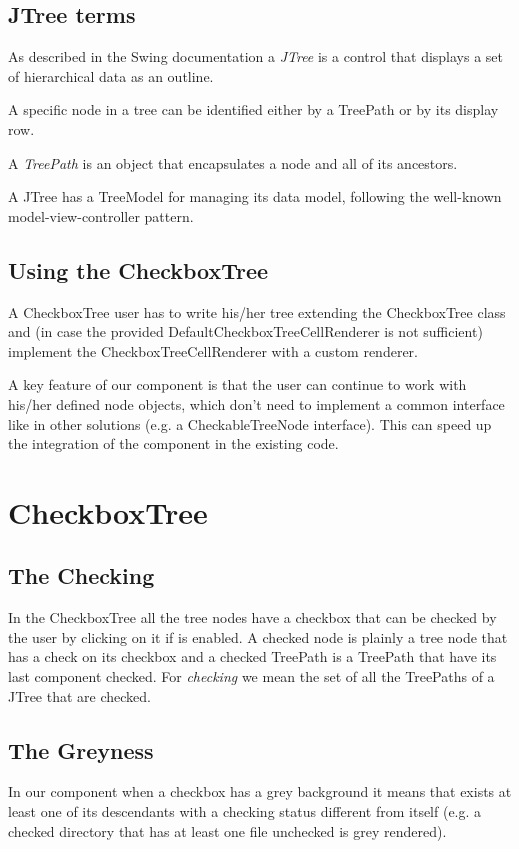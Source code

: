 \documentclass[twocolumn,desyfonts,twoside]{desypaper}  %
\def\CJT{CheckboxTree}
\begin{document}
\subsection{JTree terms}
As described in the Swing documentation \cite{swing-jtree} a
\emph{JTree} is a control that displays a set of hierarchical data
as an outline.

A specific node in a tree can be identified either by a TreePath or
by its display row.

A \emph{TreePath} is an object that encapsulates a node and all of
its ancestors.

A JTree has a TreeModel for managing its data model, following the
well-known model-view-controller pattern.

\subsection{Using the \CJT{}}

A \CJT{} user has to write his/her tree extending the \CJT{} class
and (in case the provided DefaultCheckboxTreeCellRenderer is not
sufficient) implement the CheckboxTreeCellRenderer with a custom
renderer.

A key feature of our component is that the user can continue to work
with his/her defined node objects, which don't need to implement a
common interface like in other solutions (e.g. a CheckableTreeNode
interface). This can speed up the integration of the component in
the existing code.

\section{\CJT{}}

\subsection{The Checking}
In the \CJT{} all the tree nodes have a checkbox that can be checked
by the user by clicking on it if is enabled. A checked node is
plainly a tree node that has a check on its checkbox and a checked
TreePath is a TreePath that have its last component checked. For
\emph{checking} we mean the set of all the TreePaths of a JTree that
are checked.


\subsection{The Greyness}
In our component when a checkbox has a grey background it means that
exists at least one of its descendants with a checking status
different from itself (e.g. a checked directory that has at least
one file unchecked is grey rendered).
\end{document}
